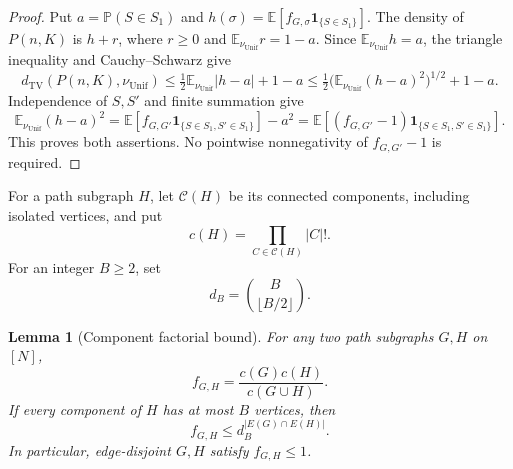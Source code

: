 \documentclass[11pt]{article}
\numberwithin{equation}{section}
\newtheorem{lemma}[lemma]{Lemma}
\newcommand{\TV}{\mathrm{TV}}
\newcommand{\Unif}{\mathrm{Unif}}
\newcommand{\E}{\mathbb E}
\newcommand{\Pp}{\mathbb P}
\newcommand{\1}{\mathbf 1}
\newcommand{\dTV}{d_{\TV}}
\newcommand{\nuUnif}{\nu_{\Unif}}
\begin{document}
\begin{proof}
Put $a=\Pp(S\in S_1)$ and
$h(\sigma)=\E[f_{G,\sigma}\1_{\{S\in S_1\}}]$.
The density of $P(n,K)$ is $h+r$, where $r\ge0$ and
$\E_{\nuUnif}r=1-a$. Since $\E_{\nuUnif}h=a$, the triangle inequality
and Cauchy--Schwarz give
\[
 \dTV(P(n,K),\nuUnif)
 \le\tfrac12\E_{\nuUnif}|h-a|+1-a
 \le\tfrac12\bigl(\E_{\nuUnif}(h-a)^2\bigr)^{1/2}+1-a.
\]
Independence of $S,S'$ and finite summation give
\[
 \E_{\nuUnif}(h-a)^2
 =\E[f_{G,G'}\1_{\{S\in S_1,S'\in S_1\}}]-a^2
 =\E[(f_{G,G'}-1)\1_{\{S\in S_1,S'\in S_1\}}].
\]
This proves both assertions. No pointwise nonnegativity of $f_{G,G'}-1$
is required.
\end{proof}

For a path subgraph $H$, let $\mathcal C(H)$ be its connected components,
including isolated vertices, and put
\[
 c(H)=\prod_{C\in\mathcal C(H)}|C|!.
\]
For an integer $B\ge2$, set
\begin{equation}
\label{eq:ub-component-constant}
 d_B=\binom{B}{\lfloor B/2\rfloor}.
\end{equation}

\begin{lemma}[Component factorial bound]
\label{lem:ub-component-factorial}
For any two path subgraphs $G,H$ on $[N]$,
\begin{equation}
\label{eq:ub-factorial-overlap-identity}
 f_{G,H}=\frac{c(G)c(H)}{c(G\cup H)}.
\end{equation}
If every component of $H$ has at most $B$ vertices, then
\begin{equation}
\label{eq:ub-component-factorial-bound}
 f_{G,H}\le d_B^{|E(G)\cap E(H)|}.
\end{equation}
In particular, edge-disjoint $G,H$ satisfy $f_{G,H}\le1$.
\end{lemma}
\end{document}
